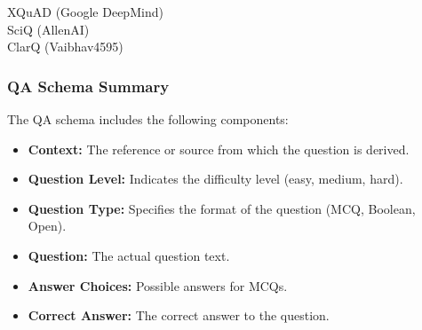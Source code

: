 \begin{description}
    \item[XQuAD (Google DeepMind) \cite{artetxe2019cross}]
    
    \item[SciQ \cite{pedersen2020sciq} (AllenAI)]
    
    \item[ClarQ \cite{kumar2020clarq} (Vaibhav4595)]
\end{description}

\subsubsection{QA Schema Summary}

The QA schema includes the following components:
\begin{itemize}
    \item \textbf{Context:} The reference or source from which the question is derived.
    \item \textbf{Question Level:} Indicates the difficulty level (easy, medium, hard).
    \item \textbf{Question Type:} Specifies the format of the question (MCQ, Boolean, Open).
    \item \textbf{Question:} The actual question text.
    \item \textbf{Answer Choices:} Possible answers for MCQs.
    \item \textbf{Correct Answer:} The correct answer to the question.
\end{itemize}

